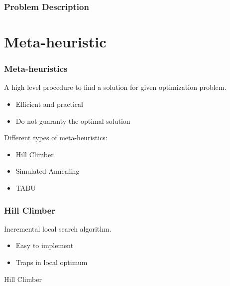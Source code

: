 \documentclass{beamer}
\makeatletter
\newenvironment{algorithm}[1][]{%
  \def\@captype{algorithm}%
  \par\nobreak\begin{center}\nobreak}
  {\par\nobreak\end{center}\nobreak}
\newcounter{algorithm}
\makeatother
\begin{document}

\begin{frame}
\frametitle{Problem Description}

\end{frame}














\section{Meta-heuristic} 
\begin{frame}
\frametitle{Meta-heuristics}
A high level procedure to find a solution for given optimization problem.
\begin{itemize}
\item Efficient and practical 
\item Do not guaranty the optimal solution
\end{itemize}
Different types of meta-heuristics:
\begin{itemize}
\item Hill Climber
\item Simulated Annealing
\item TABU
\end{itemize}
\end{frame}
\begin{frame}
\frametitle{Hill Climber}
Incremental local search algorithm. 
\begin{itemize}
\item Easy to implement
\item Traps in local optimum
\end{itemize}
\begin{algorithm}[H]
\begin{algorithmic}[1]
\REPEAT
{}
\ENDIF
{}
\end{algorithmic}
\caption{Hill Climber }
\label{alg:seq}
\end{algorithm}
\end{frame}
\end{document}
